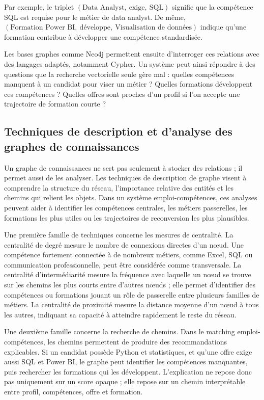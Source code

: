 \documentclass[12pt,twoside]{report}
\begin{document}
Par exemple, le triplet $(\text{Data Analyst},\ \text{exige},\ \text{SQL})$ signifie que la compétence SQL est requise pour le métier de data analyst. De même, $(\text{Formation Power BI},\ \text{développe},\ \text{Visualisation de données})$ indique qu'une formation contribue à développer une compétence standardisée.

Les bases graphes comme Neo4j permettent ensuite d'interroger ces relations avec des langages adaptés, notamment Cypher. Un système peut ainsi répondre à des questions que la recherche vectorielle seule gère mal : quelles compétences manquent à un candidat pour viser un métier ? Quelles formations développent ces compétences ? Quelles offres sont proches d'un profil si l'on accepte une trajectoire de formation courte ?
  
\subsection{Techniques de description et d'analyse des graphes de connaissances}
Un graphe de connaissances ne sert pas seulement à stocker des relations ; il permet aussi de les analyser. Les techniques de description de graphe visent à comprendre la structure du réseau, l'importance relative des entités et les chemins qui relient les objets. Dans un système emploi-compétences, ces analyses peuvent aider à identifier les compétences centrales, les métiers passerelles, les formations les plus utiles ou les trajectoires de reconversion les plus plausibles.

Une première famille de techniques concerne les mesures de centralité. La centralité de degré mesure le nombre de connexions directes d'un nœud. Une compétence fortement connectée à de nombreux métiers, comme Excel, SQL ou communication professionnelle, peut être considérée comme transversale. La centralité d'intermédiarité mesure la fréquence avec laquelle un nœud se trouve sur les chemins les plus courts entre d'autres nœuds ; elle permet d'identifier des compétences ou formations jouant un rôle de passerelle entre plusieurs familles de métiers. La centralité de proximité mesure la distance moyenne d'un nœud à tous les autres, indiquant sa capacité à atteindre rapidement le reste du réseau.

Une deuxième famille concerne la recherche de chemins. Dans le matching emploi-compétences, les chemins permettent de produire des recommandations explicables. Si un candidat possède Python et statistiques, et qu'une offre exige aussi SQL et Power BI, le graphe peut identifier les compétences manquantes, puis rechercher les formations qui les développent. L'explication ne repose donc pas uniquement sur un score opaque ; elle repose sur un chemin interprétable entre profil, compétences, offre et formation.
\end{document}
